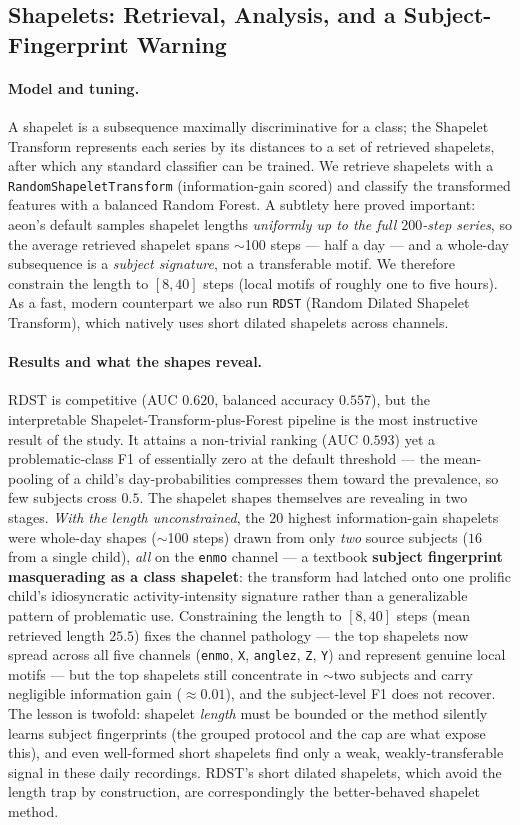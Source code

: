 \subsection{Shapelets: Retrieval, Analysis, and a Subject-Fingerprint Warning}
\paragraph{Model and tuning.} A shapelet is a subsequence maximally discriminative for a class; the Shapelet Transform represents each series by its distances to a set of retrieved shapelets, after which any standard classifier can be trained. We retrieve shapelets with a \texttt{RandomShapeletTransform} (information-gain scored) and classify the transformed features with a balanced Random Forest. A subtlety here proved important: aeon's default samples shapelet lengths \emph{uniformly up to the full $200$-step series}, so the average retrieved shapelet spans $\sim$100 steps --- half a day --- and a whole-day subsequence is a \emph{subject signature}, not a transferable motif. We therefore constrain the length to $[8,40]$ steps (local motifs of roughly one to five hours). As a fast, modern counterpart we also run \texttt{RDST} (Random Dilated Shapelet Transform), which natively uses short dilated shapelets across channels.

\paragraph{Results and what the shapes reveal.} RDST is competitive (AUC $0.620$, balanced accuracy $0.557$), but the interpretable Shapelet-Transform-plus-Forest pipeline is the most instructive result of the study. It attains a non-trivial ranking (AUC $0.593$) yet a problematic-class F1 of essentially zero at the default threshold --- the mean-pooling of a child's day-probabilities compresses them toward the prevalence, so few subjects cross $0.5$. The shapelet shapes themselves are revealing in two stages. \emph{With the length unconstrained}, the $20$ highest information-gain shapelets were whole-day shapes ($\sim$100 steps) drawn from only \emph{two} source subjects ($16$ from a single child), \emph{all} on the \texttt{enmo} channel --- a textbook \textbf{subject fingerprint masquerading as a class shapelet}: the transform had latched onto one prolific child's idiosyncratic activity-intensity signature rather than a generalizable pattern of problematic use. Constraining the length to $[8,40]$ steps (mean retrieved length $25.5$) fixes the channel pathology --- the top shapelets now spread across all five channels (\texttt{enmo}, \texttt{X}, \texttt{anglez}, \texttt{Z}, \texttt{Y}) and represent genuine local motifs --- but the top shapelets still concentrate in $\sim$two subjects and carry negligible information gain ($\approx 0.01$), and the subject-level F1 does not recover. The lesson is twofold: shapelet \emph{length} must be bounded or the method silently learns subject fingerprints (the grouped protocol and the cap are what expose this), and even well-formed short shapelets find only a weak, weakly-transferable signal in these daily recordings. RDST's short dilated shapelets, which avoid the length trap by construction, are correspondingly the better-behaved shapelet method.


